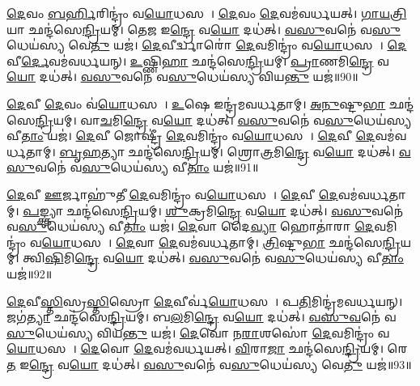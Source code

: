 \ul{𑌦𑍇}𑌵𑌂 \ul{𑌬}\ul{𑌰𑍍}𑌹𑌿𑌰𑌿𑌨𑍍𑌦𑍍𑌰𑌂॑ 𑌵\ul{𑌯𑍋}𑌧𑌸𑌮𑍍᳚।
\ul{𑌦𑍇}𑌵𑌂 \ul{𑌦𑍇}𑌵𑌮॑𑌵𑌰𑍍𑌧𑌯𑌤𑍍।
\ul{𑌗𑌾}\ul{𑌯}\ul{𑌤𑍍𑌰𑌿}𑌯𑌾 𑌛𑌨𑍍𑌦॑𑌸𑍇\ul{𑌨𑍍𑌦𑍍𑌰𑌿}𑌯𑌮𑍍।
𑌤𑍇\ul{𑌜} 𑌇\ul{𑌨𑍍𑌦𑍍𑌰𑍇} 𑌵\ul{𑌯𑍋} 𑌦𑌧॑𑌤𑍍।
\ul{𑌵}\ul{𑌸𑍁}𑌵𑌨𑍇॑ 𑌵\ul{𑌸𑍁}𑌧𑍇𑌯॑𑌸𑍍𑌯 𑌵𑍇\ul{𑌤𑍁} 𑌯𑌜॑।
\ul{𑌦𑍇}𑌵𑍀𑌰𑍍𑌦𑍍𑌵𑌾𑌰𑍋॑ \ul{𑌦𑍇}𑌵𑌮𑌿𑌨𑍍𑌦𑍍𑌰𑌂॑ 𑌵\ul{𑌯𑍋}𑌧𑌸𑌮𑍍᳚।
\ul{𑌦𑍇}𑌵𑍀\ul{𑌰𑍍𑌦𑍇}𑌵𑌮॑𑌵𑌰𑍍𑌧𑌯𑌨𑍍।
\ul{𑌉}𑌷𑍍𑌣𑌿\ul{𑌹𑌾} 𑌛𑌨𑍍𑌦॑𑌸𑍇\ul{𑌨𑍍𑌦𑍍𑌰𑌿}𑌯𑌮𑍍।
\ul{𑌪𑍍𑌰𑌾}𑌣𑌮𑌿\ul{𑌨𑍍𑌦𑍍𑌰𑍇} 𑌵\ul{𑌯𑍋} 𑌦𑌧॑𑌤𑍍।
\ul{𑌵}\ul{𑌸𑍁}𑌵𑌨𑍇॑ 𑌵\ul{𑌸𑍁}𑌧𑍇𑌯॑𑌸𑍍𑌯 𑌵𑌿𑌯\ul{𑌨𑍍𑌤𑍁} 𑌯𑌜॑॥90॥

\ul{𑌦𑍇}𑌵𑍀 \ul{𑌦𑍇}𑌵𑌂 𑌵॑\ul{𑌯𑍋}𑌧𑌸𑌮𑍍᳚।
\ul{𑌉}𑌷𑍇 𑌇𑌨𑍍𑌦𑍍𑌰॑𑌮𑌵𑌰𑍍𑌧𑌤𑌾𑌮𑍍।
\ul{𑌅}\ul{𑌨𑍁}𑌷𑍍𑌟𑍁\ul{𑌭𑌾} 𑌛𑌨𑍍𑌦॑𑌸𑍇\ul{𑌨𑍍𑌦𑍍𑌰𑌿}𑌯𑌮𑍍।
𑌵𑌾\ul{𑌚}𑌮𑌿\ul{𑌨𑍍𑌦𑍍𑌰𑍇} 𑌵\ul{𑌯𑍋} 𑌦𑌧॑𑌤𑍍।
\ul{𑌵}\ul{𑌸𑍁}𑌵𑌨𑍇॑ 𑌵\ul{𑌸𑍁}𑌧𑍇𑌯॑𑌸𑍍𑌯 𑌵𑍀\ul{𑌤𑌾𑌂} 𑌯𑌜॑।
\ul{𑌦𑍇}𑌵𑍀 𑌜𑍋𑌷𑍍𑌟𑍍𑌰𑍀॑ \ul{𑌦𑍇}𑌵𑌮𑌿𑌨𑍍𑌦𑍍𑌰𑌂॑ 𑌵\ul{𑌯𑍋}𑌧𑌸𑌮𑍍᳚।
\ul{𑌦𑍇}𑌵𑍀 \ul{𑌦𑍇}𑌵𑌮॑𑌵𑌰𑍍𑌧𑌤𑌾𑌮𑍍।
\ul{𑌬𑍃}\ul{𑌹}𑌤𑍍𑌯𑌾 𑌛𑌨𑍍𑌦॑𑌸𑍇\ul{𑌨𑍍𑌦𑍍𑌰𑌿}𑌯𑌮𑍍।
𑌶𑍍𑌰𑍋\ul{𑌤𑍍𑌰}𑌮𑌿\ul{𑌨𑍍𑌦𑍍𑌰𑍇} 𑌵\ul{𑌯𑍋} 𑌦𑌧॑𑌤𑍍।
\ul{𑌵}\ul{𑌸𑍁}𑌵𑌨𑍇॑ 𑌵\ul{𑌸𑍁}𑌧𑍇𑌯॑𑌸𑍍𑌯 𑌵𑍀\ul{𑌤𑌾𑌂} 𑌯𑌜॑॥91॥

\ul{𑌦𑍇}𑌵𑍀 \ul{𑌊}𑌰𑍍𑌜𑌾𑌹𑍁॑𑌤𑍀 \ul{𑌦𑍇}𑌵𑌮𑌿𑌨𑍍𑌦𑍍𑌰𑌂॑ 𑌵\ul{𑌯𑍋}𑌧𑌸𑌮𑍍᳚।
\ul{𑌦𑍇}𑌵𑍀 \ul{𑌦𑍇}𑌵𑌮॑𑌵𑌰𑍍𑌧𑌤𑌾𑌮𑍍।
\ul{𑌪}𑌙𑍍𑌕𑍍𑌤𑍍𑌯𑌾 𑌛𑌨𑍍𑌦॑𑌸𑍇\ul{𑌨𑍍𑌦𑍍𑌰𑌿}𑌯𑌮𑍍।
\ul{𑌶𑍁}𑌕𑍍𑌰𑌮𑌿\ul{𑌨𑍍𑌦𑍍𑌰𑍇} 𑌵\ul{𑌯𑍋} 𑌦𑌧॑𑌤𑍍।
\ul{𑌵}\ul{𑌸𑍁}𑌵𑌨𑍇॑ 𑌵\ul{𑌸𑍁}𑌧𑍇𑌯॑𑌸𑍍𑌯 𑌵𑍀\ul{𑌤𑌾𑌂} 𑌯𑌜॑।
\ul{𑌦𑍇}𑌵𑌾 𑌦𑍈\ul{𑌵𑍍𑌯𑌾} 𑌹𑍋𑌤𑌾॑𑌰𑌾 \ul{𑌦𑍇}𑌵𑌮𑌿𑌨𑍍𑌦𑍍𑌰𑌂॑ 𑌵\ul{𑌯𑍋}𑌧𑌸𑌮𑍍᳚।
\ul{𑌦𑍇}𑌵𑌾 \ul{𑌦𑍇}𑌵𑌮॑𑌵𑌰𑍍𑌧𑌤𑌾𑌮𑍍।
\ul{𑌤𑍍𑌰𑌿}𑌷𑍍𑌟𑍁\ul{𑌭𑌾} 𑌛𑌨𑍍𑌦॑𑌸𑍇\ul{𑌨𑍍𑌦𑍍𑌰𑌿}𑌯𑌮𑍍।
𑌤𑍍𑌵𑌿\ul{𑌷𑌿}𑌮𑌿\ul{𑌨𑍍𑌦𑍍𑌰𑍇} 𑌵\ul{𑌯𑍋} 𑌦𑌧॑𑌤𑍍।
\ul{𑌵}\ul{𑌸𑍁}𑌵𑌨𑍇॑ 𑌵\ul{𑌸𑍁}𑌧𑍇𑌯॑𑌸𑍍𑌯 𑌵𑍀\ul{𑌤𑌾𑌂} 𑌯𑌜॑॥92॥

\ul{𑌦𑍇}𑌵𑍀\ul{𑌸𑍍𑌤𑌿}𑌸𑍍𑌰\ul{𑌸𑍍𑌤𑌿}𑌸𑍍𑌰𑍋 \ul{𑌦𑍇}𑌵𑍀𑌰𑍍𑌵॑\ul{𑌯𑍋}𑌧𑌸𑌮𑍍᳚।
𑌪\ul{𑌤𑌿}𑌮𑌿𑌨𑍍𑌦𑍍𑌰॑𑌮𑌵𑌰𑍍𑌧𑌯𑌨𑍍।
𑌜𑌗॑\ul{𑌤𑍍𑌯𑌾} 𑌛𑌨𑍍𑌦॑𑌸𑍇\ul{𑌨𑍍𑌦𑍍𑌰𑌿}𑌯𑌮𑍍।
𑌬\ul{𑌲}𑌮𑌿\ul{𑌨𑍍𑌦𑍍𑌰𑍇} 𑌵\ul{𑌯𑍋} 𑌦𑌧॑𑌤𑍍।
\ul{𑌵}\ul{𑌸𑍁}\ul{𑌵}𑌨𑍇॑ 𑌵\ul{𑌸𑍁}𑌧𑍇𑌯॑𑌸𑍍𑌯 𑌵𑌿𑌯\ul{𑌨𑍍𑌤𑍁} 𑌯𑌜॑।
\ul{𑌦𑍇}𑌵𑍋 𑌨\ul{𑌰𑌾}𑌶𑌸𑍋॑ \ul{𑌦𑍇}𑌵𑌮𑌿𑌨𑍍𑌦𑍍𑌰𑌂॑ 𑌵\ul{𑌯𑍋}𑌧𑌸𑌮𑍍᳚।
\ul{𑌦𑍇}𑌵𑍋 \ul{𑌦𑍇}𑌵𑌮॑𑌵𑌰𑍍𑌧𑌯𑌤𑍍।
\ul{𑌵𑌿}𑌰𑌾\ul{𑌜𑌾} 𑌛𑌨𑍍𑌦॑𑌸𑍇\ul{𑌨𑍍𑌦𑍍𑌰𑌿}𑌯𑌮𑍍।
𑌰𑍇\ul{𑌤} 𑌇\ul{𑌨𑍍𑌦𑍍𑌰𑍇} 𑌵\ul{𑌯𑍋} 𑌦𑌧॑𑌤𑍍।
\ul{𑌵}\ul{𑌸𑍁}𑌵𑌨𑍇॑ 𑌵\ul{𑌸𑍁}𑌧𑍇𑌯॑𑌸𑍍𑌯 𑌵𑍇\ul{𑌤𑍁} 𑌯𑌜॑॥93॥

